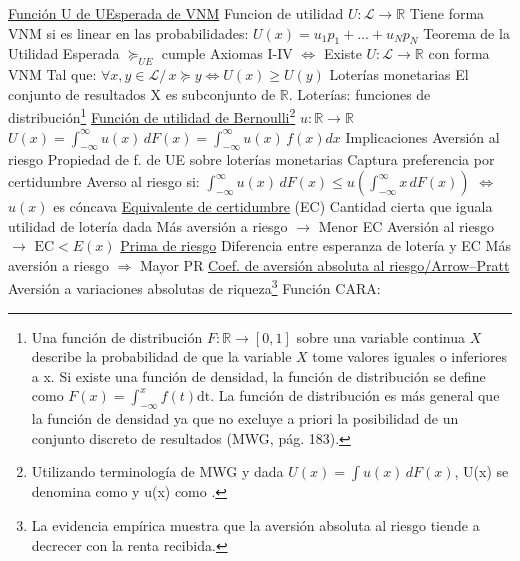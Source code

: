 \documentclass{nuevotema}
\begin{document}
\begin{esquemal}
				\4 \underline{Función U de UEsperada de VNM}
				\4[] Funcion de utilidad $U: \mathcal{L} \to \mathbb{R}$
				\4[] Tiene forma VNM si es linear en las probabilidades:
				\4[] $U(x) = u_1 p_1 + ... + u_N p_N$
			\3 Teorema de la Utilidad Esperada
				\4 $\succeq_{UE}$ cumple Axiomas I-IV
				\4[] $\iff$
				\4[] Existe $U: \mathcal{L} \rightarrow \mathbb{R}$ con forma VNM
				\4[] Tal que: $\forall x, y \in \mathcal{L} / \, x \succeq y \iff U(x) \geq U(y)$
			\3 Loterías monetarias
				\4 El conjunto de resultados X es subconjunto de $\mathbb{R}$.
				\4 Loterías: funciones de distribución\footnote{Una función de distribución $F: \mathbb{R} \to [0,1]$ sobre una variable continua $X$ describe la probabilidad de que la variable $X$ tome valores iguales o inferiores a x. Si existe una función de densidad, la función de distribución se define como $F(x) = \int_{-\infty}^x f(t) \text{dt}$. La función de distribución es más general que la función de densidad ya que no excluye a priori la posibilidad de un conjunto discreto de resultados (MWG, pág. 183).}
				\4 \underline{Función de utilidad de Bernoulli}\footnote{Utilizando terminología de MWG y dada $U(x) = \int u(x) \, dF(x)$, U(x) se denomina como  y u(x) como .}
				\4[] $u: \mathbb{R} \to \mathbb{R}$
				\4[] $U(x) = \int_{-\infty}^{\infty} u(x) \, dF(x) = \int_{-\infty}^{\infty} u(x) \, f(x) dx $
		\2 Implicaciones
			\3 Aversión al riesgo
				\4 Propiedad de f. de UE sobre loterías monetarias
				\4 Captura preferencia por certidumbre
				\4 Averso al riesgo si:
				\4[] $\int_{-\infty}^{\infty} u(x) \, dF(x) \leq u \left( \int_{-\infty}^{\infty} x \, dF(x) \right)$
				\4[] $\iff$ $u(x)$ es cóncava
				\4 \underline{Equivalente de certidumbre} (EC)
				\4[] Cantidad cierta que iguala utilidad de lotería dada
				\4[] Más aversión a riesgo $\to$ Menor EC
				\4[] Aversión al riesgo $\to$ $\text{EC} < E(x)$
				\4[] 
				\4 \underline{Prima de riesgo}
				\4[] Diferencia entre esperanza de lotería y EC
				\4[] Más aversión a riesgo $\Rightarrow$ Mayor PR
				\4[] 
				\4 \underline{Coef. de aversión absoluta al riesgo/Arrow--Pratt}%
				\4[] Aversión a variaciones absolutas de riqueza\footnote{La evidencia empírica muestra que la aversión absoluta al riesgo tiende a decrecer con la renta recibida.}
				\4[] 
				\4[] Función CARA:

\end{esquemal}
\end{document}
